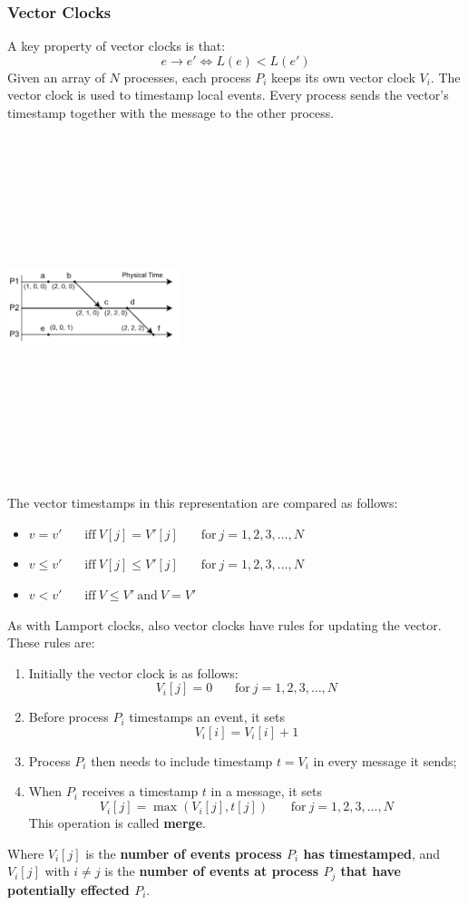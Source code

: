 \documentclass{article}
\begin{document}
\subsubsection{Vector Clocks}
A key property of vector clocks is that:
\[ e \rightarrow e' \Leftrightarrow L(e) < L(e') \]
Given an array of $N$ processes, each process $P_i$ keeps its own vector clock $V_i$. The vector clock is used to timestamp local events. Every process sends the vector's timestamp together with the message to the other process.
\begin{center}
	\includegraphics[width=5cm, height=10cm, keepaspectratio]{assets/vector-clocks.pdf}
\end{center}
The vector timestamps in this representation are compared as follows:
\begin{itemize}
	\item $v = v' ~~~~~~~~\text{iff}~V[j] = V'[j] ~~~~~~~~\text{for}~j = 1, 2, 3, \dots, N$
	\item $v \leq v' ~~~~~~~~\text{iff}~V[j] \leq V'[j] ~~~~~~~~\text{for}~j = 1, 2, 3, \dots, N$
	\item $v < v' ~~~~~~~~\text{iff}~V \leq V' ~\text{and}~ V = V'$
\end{itemize}
As with Lamport clocks, also vector clocks have rules for updating the vector. These rules are:
\begin{enumerate}
	\item Initially the vector clock is as follows:
	\[ V_i[j] = 0 ~~~~~~~~\text{for}~j = 1, 2, 3, \dots, N \]
	\item Before process $P_i$ timestamps an event, it sets
	\[ V_i[i] = V_i[i] + 1 \]
	\item Process $P_i$ then needs to include timestamp $t = V_i$ in every message it sends;
	\item When $P_i$ receives a timestamp $t$ in a message, it sets
	\[ V_i[j] = \max(V_i[j], t[j]) ~~~~~~~~\text{for}~j = 1, 2, 3, \dots, N \]
	This operation is called \textbf{merge}.
\end{enumerate}
Where $V_i[j]$ is the \textbf{number of events process $P_i$ has timestamped}, and $V_i[j]$ with $i \neq j$ is the \textbf{number of events at process $P_j$ that have potentially effected $P_i$}.
\end{document}
